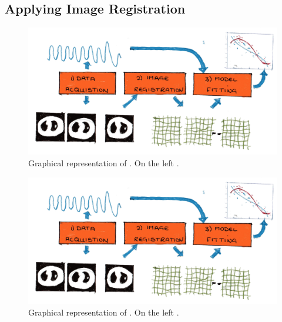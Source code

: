         \subsection{Applying Image Registration} \label{sec:applying_image_registration}
            \begin{figure}
                \centering
                        
                \includegraphics[width=1.0\linewidth]{figures/background_motion_model.png}
                        
                \captionsetup{singlelinecheck=false, justification=raggedright}
                \caption{Graphical representation of . On the left .} \label{fig:applying_image_registration_pairwise_groupwise_comparison}
            \end{figure}
            
            \begin{figure}
                \centering
                        
                \includegraphics[width=1.0\linewidth]{figures/background_motion_model.png}
                        
                \captionsetup{singlelinecheck=false, justification=raggedright}
                \caption{Graphical representation of . On the left .} \label{fig:applying_image_registration_groupwise_breakdown}
            \end{figure}
            
